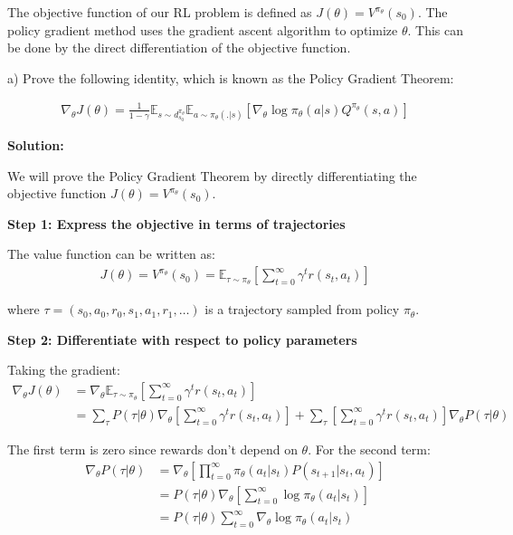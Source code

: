 The objective function of our RL problem is defined as $J(\theta) = V^{\pi_\theta}(s_0)$. The policy gradient method uses the gradient ascent algorithm to optimize $\theta$. This can be done by the direct differentiation of the objective function.

a) Prove the following identity, which is known as the Policy Gradient Theorem:

\begin{align}\label{policy_grad}
    \nabla_\theta J(\theta) = \frac{1}{1-\gamma}\mathbb{E}_{s \sim d^{\pi_\theta}_{s_0}}\mathbb{E}_{a \sim \pi_\theta(.|s)} [\nabla_\theta \log \pi_\theta (a|s) Q^{\pi_\theta} (s, a)]
\end{align}

\textbf{Solution:}

We will prove the Policy Gradient Theorem by directly differentiating the objective function $J(\theta) = V^{\pi_\theta}(s_0)$.

\textbf{Step 1: Express the objective in terms of trajectories}

The value function can be written as:
\begin{align}
J(\theta) = V^{\pi_\theta}(s_0) = \mathbb{E}_{\tau \sim \pi_\theta} \left[ \sum_{t=0}^{\infty} \gamma^t r(s_t, a_t) \right]
\end{align}

where $\tau = (s_0, a_0, r_0, s_1, a_1, r_1, \ldots)$ is a trajectory sampled from policy $\pi_\theta$.

\textbf{Step 2: Differentiate with respect to policy parameters}

Taking the gradient:
\begin{align}
\nabla_\theta J(\theta) &= \nabla_\theta \mathbb{E}_{\tau \sim \pi_\theta} \left[ \sum_{t=0}^{\infty} \gamma^t r(s_t, a_t) \right] \\
&= \sum_{\tau} P(\tau|\theta) \nabla_\theta \left[ \sum_{t=0}^{\infty} \gamma^t r(s_t, a_t) \right] + \sum_{\tau} \left[ \sum_{t=0}^{\infty} \gamma^t r(s_t, a_t) \right] \nabla_\theta P(\tau|\theta)
\end{align}

The first term is zero since rewards don't depend on $\theta$. For the second term:
\begin{align}
\nabla_\theta P(\tau|\theta) &= \nabla_\theta \left[ \prod_{t=0}^{\infty} \pi_\theta(a_t|s_t) P(s_{t+1}|s_t, a_t) \right] \\
&= P(\tau|\theta) \nabla_\theta \left[ \sum_{t=0}^{\infty} \log \pi_\theta(a_t|s_t) \right] \\
&= P(\tau|\theta) \sum_{t=0}^{\infty} \nabla_\theta \log \pi_\theta(a_t|s_t)
\end{align}

